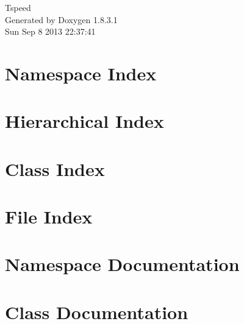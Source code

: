 \documentclass{book}
\begin{document}
\hypersetup{pageanchor=false,citecolor=blue}
\begin{titlepage}
\vspace*{7cm}
\begin{center}
{\Large Tspeed }\\
\vspace*{1cm}
{\large Generated by Doxygen 1.8.3.1}\\
\vspace*{0.5cm}
{\small Sun Sep 8 2013 22:37:41}\\
\end{center}
\end{titlepage}
\clearemptydoublepage
{}
\tableofcontents
\clearemptydoublepage
{}
\hypersetup{pageanchor=true,citecolor=blue}
\chapter{Namespace Index}

\chapter{Hierarchical Index}

\chapter{Class Index}

\chapter{File Index}

\chapter{Namespace Documentation}


\chapter{Class Documentation}

























\end{document}
